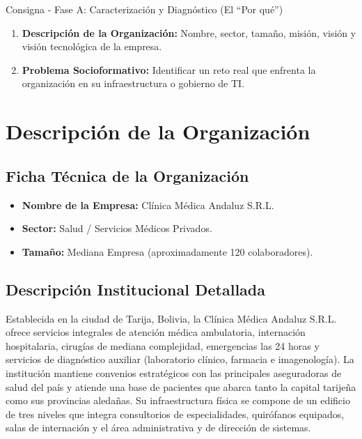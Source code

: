 \begin{IHBoxInfo}{Consigna - Fase A: Caracterización y Diagnóstico (El ``Por qué'')}
    \begin{enumerate}
        \item \textbf{Descripción de la Organización:} Nombre, sector, tamaño, misión, visión y visión tecnológica de la empresa.
        \item \textbf{Problema Socioformativo:} Identificar un reto real que enfrenta la organización en su infraestructura o gobierno de TI.
    \end{enumerate}
\end{IHBoxInfo}
\vspace{0.5cm}

\section{Descripción de la Organización}

\subsection{Ficha Técnica de la Organización}
\begin{itemize}
    \item \textbf{Nombre de la Empresa:} Clínica Médica Andaluz S.R.L.
    \item \textbf{Sector:} Salud / Servicios Médicos Privados.
    \item \textbf{Tamaño:} Mediana Empresa (aproximadamente 120 colaboradores).
\end{itemize}

\subsection{Descripción Institucional Detallada}
Establecida en la ciudad de Tarija, Bolivia, la Clínica Médica Andaluz S.R.L. ofrece servicios integrales de atención médica ambulatoria, internación hospitalaria, cirugías de mediana complejidad, emergencias las 24 horas y servicios de diagnóstico auxiliar (laboratorio clínico, farmacia e imagenología). La institución mantiene convenios estratégicos con las principales aseguradoras de salud del país y atiende una base de pacientes que abarca tanto la capital tarijeña como sus provincias aledañas. Su infraestructura física se compone de un edificio de tres niveles que integra consultorios de especialidades, quirófanos equipados, salas de internación y el área administrativa y de dirección de sistemas.


